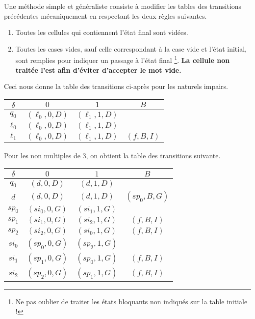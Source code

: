 Une méthode simple et généraliste consiste à modifier les tables des transitions précédentes mécaniquement en respectant les deux règles suivantes.
\begin{enumerate}
	\item Toutes les cellules qui contiennent l'état final sont vidées.

	\item Toutes les cases vides, sauf celle correspondant à la case vide et l'état initial, sont remplies pour indiquer un passage à l'état final
		  \footnote{
			Ne pas oublier de traiter les états bloquants non indiqués sur la table initiale !
		  }.
	      \textbf{La cellule non traitée l'est afin d'éviter d'accepter le mot vide.} 
\end{enumerate}



Ceci nous donne la table des transitions ci-après pour les naturels impairs.
\begin{center}
	\begin{tabular}{|c||c|c|c|}
		\hline
		$\delta$ 
			& $0$ 
			& $1$
			& $B$ \\
		\hline
		\hline
		$q_0$
			& $(\ell_0 , 0 , D)$
			& $(\ell_1 , 1 , D)$
			&                     \\
		\hline
		\hline
		$\ell_0$
			& $(\ell_0 , 0 , D)$
			& $(\ell_1 , 1 , D)$
			&                     \\
		\hline
		$\ell_1$
			& $(\ell_0 , 0 , D)$
			& $(\ell_1 , 1 , D)$
			& $(f      , B , I)$ \\
		\hline
	\end{tabular}
\end{center}


Pour les non multiples de $3$, on obtient la table des transitions suivante.
\begin{center}
	\begin{tabular}{|c||c|c|c|}
		\hline
		$\delta$ 
			& $0$ 
			& $1$
			& $B$ \\
		\hline
		\hline
		$q_0$ 
			& $(d , 0, D)$ 
			& $(d , 1, D)$
			&  \\
		\hline
		$d$ 
			& $(d , 0, D)$ 
			& $(d , 1, D)$
			& $(sp_0, B, G)$ \\
		\hline
		\hline
		$sp_0$ 
			& $(si_0 , 0, G)$ 
			& $(si_1 , 1, G)$
			&                 \\
		\hline
		$sp_1$ 
			& $(si_1 , 0, G)$ 
			& $(si_2 , 1, G)$
			& $(f    , B, I)$ \\
		\hline
		$sp_2$ 
			& $(si_2 , 0, G)$ 
			& $(si_0 , 1, G)$
			& $(f    , B, I)$ \\
		\hline
		\hline
		$si_0$ 
			& $(sp_0 , 0, G)$ 
			& $(sp_2 , 1, G)$
			&                 \\
		\hline
		$si_1$ 
			& $(sp_1 , 0, G)$ 
			& $(sp_0 , 1, G)$
			& $(f    , B, I)$ \\
		\hline
		$si_2$ 
			& $(sp_2 , 0, G)$ 
			& $(sp_1 , 1, G)$
			& $(f    , B, I)$ \\
		\hline
	\end{tabular}
\end{center}

